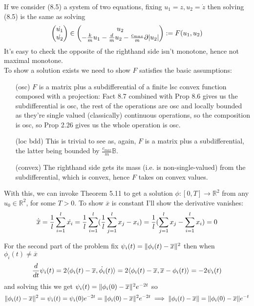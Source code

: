 \documentclass{article}
\newenvironment{ex}[1]
  {\renewcommand\theexercise{#1}\exercise}
  {\endexercise}
\newcommand{\B}{\mathbb{B}}
\newcommand{\R}[1]{\mathbb{R}^{#1}}
\newcommand{\xb}{\overline{x}}
\begin{document}
\begin{ex}{8.16} %
  If we consider (8.5) a system of two equations, fixing $u_1 = z, u_2 = \dot{z}$ then solving (8.5) is the same as solving
  $$
  \begin{pmatrix}
    \dot{u_1} \\
    \dot{u_2}
  \end{pmatrix} \in \begin{pmatrix}
    u_2 \\
    -\frac{k}{m} u_1 - \frac{d}{m} u_2 - \frac{c_{max}}{m} \partial \lvert u_2\rvert
  \end{pmatrix} := F(u_1, u_2)
  $$
  It's easy to check the opposite of the righthand side isn't monotone, hence not maximal monotone. \, \\

  To show a solution exists we need to show $F$ satisfies the basic assumptions:
  \begin{itemize}
    \item[(osc)] $F$ is a matrix plus a subdifferential of a finite lsc convex function composed with a projection: Fact 8.7 combined with Prop 8.6 gives us the subdifferential is osc, the rest of the operations are osc and locally bounded as they're single valued (classically) continuous operations, so the composition is osc, so Prop 2.26 gives us the whole operation is osc.
    \item[(loc bdd)] This is trivial to see as, again, $F$ is a matrix plus a subdifferential, the latter being bounded by $\frac{c_{max}}{m}\B$.
    \item[(convex)] The righthand side gets its mass (i.e. is non-single-valued) from the subdifferential, which is convex, hence $F$ takes on convex values.
  \end{itemize}
  With this, we can invoke Theorem 5.11 to get a solution $\phi : [0, T] \to \R{2}$ from any $u_0 \in \R{2}$, for some $T > 0$.
\end{ex} %
\begin{ex}{8.18} %
  To show $\xb$ is constant I'll show the derivative vanishes:
  $$
  \dot{\xb} = \frac{1}{l} \sum_{i=1}^l \dot{x_i} = \frac{1}{l} \sum_{i=1}^l \parens{ \frac{1}{l} \sum_{j=1}^l x_j - x_i } = \frac{1}{l} \parens{ \sum_{j=1}^l x_j - \sum_{i=1}^l x_i } = 0
  $$

  For the second part of the problem fix $\psi_i(t) = \norm{\phi_i(t) - \xb}^2$ then when $\phi_i(t) \ne \xb$
  $$
  \frac{d}{dt} \psi_i(t) = 2 \iprod{\phi_i(t) - \xb}{\dot{\phi_i}(t)} = 2 \iprod{\phi_i(t) - \xb}{\xb - \phi_i(t)} = - 2 \psi_i(t)
  $$
  and solving this we get $\psi_i(t) = \norm{\phi_i(0) - \xb}^2 e^{-2t}$ so
  $$
  \norm{\phi_i(t) - \xb}^2 = \psi_i(t) = \psi_i(0) e^{-2t} = \norm{\phi_i(0) - \xb}^2 e^{-2t} \implies \norm{\phi_i(t) - \xb} = \norm{\phi_i(0) - \xb} e^{-t}
  $$
\end{ex} %
\end{document}
